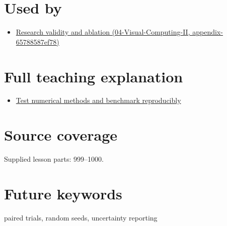 \section{Used by}\label{appendix-b9db93e28371-used-by}

\begin{itemize}
\tightlist
\item
  \href{../04-Visual-Computing-II/main.pdf\#nameddest=appendix-65788587ef78}{Research validity and ablation (04-Visual-Computing-II, appendix-65788587ef78)}
\end{itemize}

\section{Full teaching explanation}\label{appendix-b9db93e28371-full-teaching-explanation}

\begin{itemize}
\tightlist
\item
  \href{Continuous\%20Notes/Computing\%20Foundations\%20-\%20From\%20Bits\%20to\%20C++\%20and\%20Systems\%20APIs\#Test\%20numerical\%20methods\%20and\%20benchmark\%20reproducibly}{Test numerical methods and benchmark reproducibly}
\end{itemize}

\section{Source coverage}\label{appendix-b9db93e28371-source-coverage}

Supplied lesson parts: 999--1000.

\section{Future keywords}\label{appendix-b9db93e28371-future-keywords}

paired trials, random seeds, uncertainty reporting
